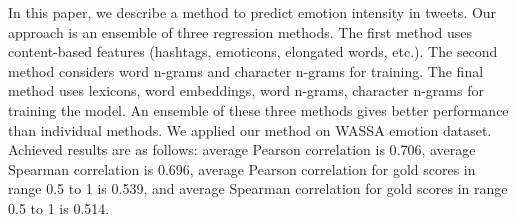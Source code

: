 In this paper, we describe a method to predict emotion intensity in tweets. Our approach is an ensemble of three regression methods. The first method uses content-based features (hashtags, emoticons, elongated words, etc.). The second method considers word n-grams and character n-grams for training. The final method uses lexicons, word embeddings, word n-grams, character n-grams for training the model. An ensemble of these three methods gives better performance than individual methods. We applied our method on WASSA emotion dataset. Achieved results are as follows: average Pearson correlation is 0.706, average Spearman correlation is 0.696, average Pearson correlation for gold scores in range 0.5 to 1 is 0.539, and average Spearman correlation for gold scores in range 0.5 to 1 is 0.514.
